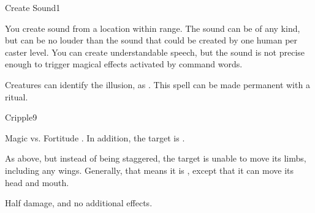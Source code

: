\begin{spellsection}{Create Sound}{1}
\begin{spellheader}
\end{spellheader}
\begin{spellcontent}
    \begin{spelltargetinginfo}
        \spellrng{\rngmed}
    \end{spelltargetinginfo}
    \begin{spelleffects}
        \spelleffect You create sound from a location within range. The sound can be of any kind, but can be no louder than the sound that could be created by one human per caster level. You can create understandable speech, but the sound is not precise enough to trigger magical effects activated by command words.
        \spelldur \durshort \dismissable
    \end{spelleffects}
\end{spellcontent}
\begin{spellfooter}
    \spellnotes Creatures can identify the illusion, as . This spell can be made permanent with a  ritual.
\end{spellfooter}
\end{spellsection}

\begin{spellsection}{Cripple}{9}
\begin{spellheader}
\end{spellheader}
\begin{spellcontent}
    \begin{spelltargetinginfo}
    \end{spelltargetinginfo}
    \begin{spelleffects}
        \begin{spellattack}{Magic vs. Fortitude}
            \spellsuccess {}. In addition, the target is \staggered.

            \spellcritical As above, but instead of being staggered, the target is unable to move its limbs, including any wings. Generally, that means it is \paralyzed, except that it can move its head and mouth.

            \spellfailure Half damage, and no additional effects.
        \end{spellattack}
        \spelldur \durshort
    \end{spelleffects}
\end{spellcontent}
\begin{spellfooter}
\end{spellfooter}
\end{spellsection}

